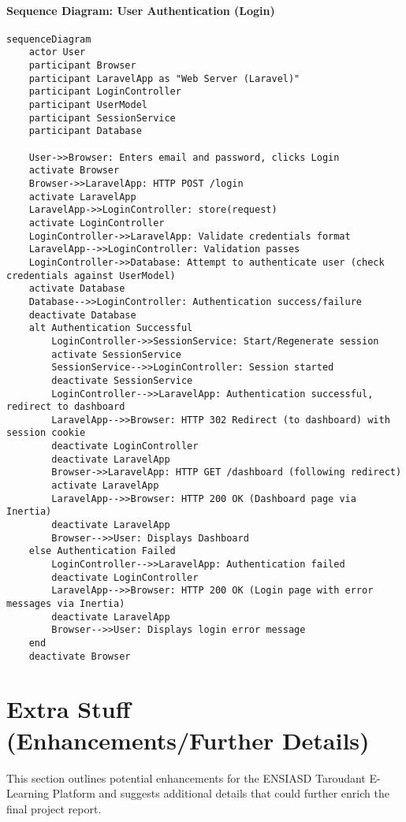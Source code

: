 \paragraph*{Sequence Diagram: User Authentication (Login)}
\begin{verbatim}
sequenceDiagram
    actor User
    participant Browser
    participant LaravelApp as "Web Server (Laravel)"
    participant LoginController
    participant UserModel
    participant SessionService
    participant Database

    User->>Browser: Enters email and password, clicks Login
    activate Browser
    Browser->>LaravelApp: HTTP POST /login
    activate LaravelApp
    LaravelApp->>LoginController: store(request)
    activate LoginController
    LoginController->>LaravelApp: Validate credentials format
    LaravelApp-->>LoginController: Validation passes
    LoginController->>Database: Attempt to authenticate user (check credentials against UserModel)
    activate Database
    Database-->>LoginController: Authentication success/failure
    deactivate Database
    alt Authentication Successful
        LoginController->>SessionService: Start/Regenerate session
        activate SessionService
        SessionService-->>LoginController: Session started
        deactivate SessionService
        LoginController-->>LaravelApp: Authentication successful, redirect to dashboard
        LaravelApp-->>Browser: HTTP 302 Redirect (to dashboard) with session cookie
        deactivate LoginController
        deactivate LaravelApp
        Browser->>LaravelApp: HTTP GET /dashboard (following redirect)
        activate LaravelApp
        LaravelApp-->>Browser: HTTP 200 OK (Dashboard page via Inertia)
        deactivate LaravelApp
        Browser-->>User: Displays Dashboard
    else Authentication Failed
        LoginController-->>LaravelApp: Authentication failed
        deactivate LoginController
        LaravelApp-->>Browser: HTTP 200 OK (Login page with error messages via Inertia)
        deactivate LaravelApp
        Browser-->>User: Displays login error message
    end
    deactivate Browser
\end{verbatim}

\section*{Extra Stuff (Enhancements/Further Details)}

This section outlines potential enhancements for the ENSIASD Taroudant E-Learning Platform and suggests additional details that could further enrich the final project report.

